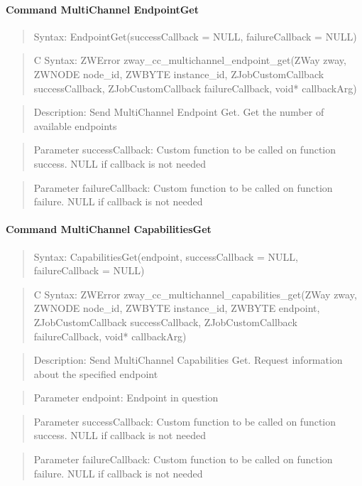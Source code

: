 \paragraph{Command MultiChannel EndpointGet}
\begin{quote}Syntax: EndpointGet(successCallback = NULL, failureCallback = NULL)\end{quote}
\begin{quote}C Syntax: ZWError zway\_cc\_multichannel\_endpoint\_get(ZWay zway, ZWNODE node\_id, ZWBYTE instance\_id, ZJobCustomCallback successCallback, ZJobCustomCallback failureCallback, void* callbackArg)\end{quote}
\begin{quote}Description: Send MultiChannel Endpoint Get. Get the number of available endpoints\end{quote}
\begin{quote}Parameter successCallback: Custom function to be called on function success. NULL if callback is not needed\end{quote}
\begin{quote}Parameter failureCallback: Custom function to be called on function failure. NULL if callback is not needed\end{quote}


\paragraph{Command MultiChannel CapabilitiesGet}
\begin{quote}Syntax: CapabilitiesGet(endpoint, successCallback = NULL, failureCallback = NULL)\end{quote}
\begin{quote}C Syntax: ZWError zway\_cc\_multichannel\_capabilities\_get(ZWay zway, ZWNODE node\_id, ZWBYTE instance\_id, ZWBYTE endpoint, ZJobCustomCallback successCallback, ZJobCustomCallback failureCallback, void* callbackArg)\end{quote}
\begin{quote}Description: Send MultiChannel Capabilities Get. Request information about the specified endpoint\end{quote}
\begin{quote}Parameter endpoint: Endpoint in question\end{quote}
\begin{quote}Parameter successCallback: Custom function to be called on function success. NULL if callback is not needed\end{quote}
\begin{quote}Parameter failureCallback: Custom function to be called on function failure. NULL if callback is not needed\end{quote}


